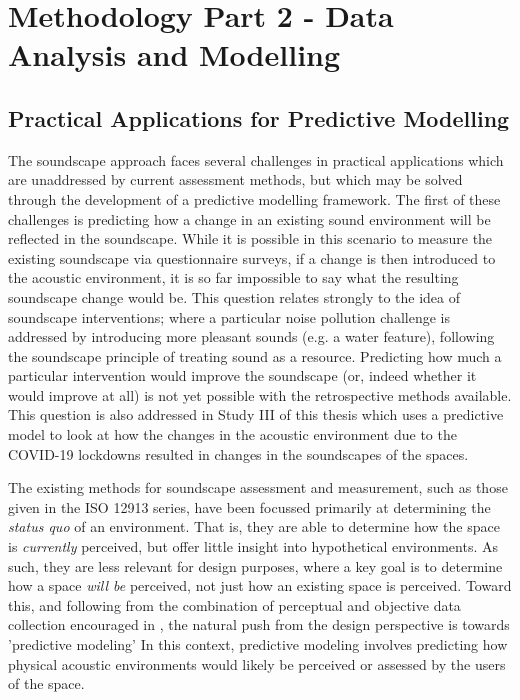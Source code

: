 \chapter{Methodology Part 2 - Data Analysis and Modelling}
\label{chap:methods}


\section{Practical Applications for Predictive Modelling}

The soundscape approach faces several challenges in practical applications which are unaddressed by current assessment methods, but which may be solved through the development of a predictive modelling framework. The first of these challenges is predicting how a change in an existing sound environment will be reflected in the soundscape. While it is possible in this scenario to measure the existing soundscape via questionnaire surveys, if a change is then introduced to the acoustic environment, it is so far impossible to say what the resulting soundscape change would be. This question relates strongly to the idea of soundscape interventions; where a particular noise pollution challenge is addressed by introducing more pleasant sounds (e.g. a water feature), following the soundscape principle of treating sound as a resource. Predicting how much a particular intervention would improve the soundscape (or, indeed whether it would improve at all) is not yet possible with the retrospective methods available. This question is also addressed in Study III of this thesis  which uses a predictive model to look at how the changes in the acoustic environment due to the COVID-19 lockdowns resulted in changes in the soundscapes of the spaces.

The existing methods for soundscape assessment and measurement, such as those given in the ISO 12913 series, have been focussed primarily at determining the \emph{status quo} of an environment. That is, they are able to determine how the space is \emph{currently} perceived, but offer little insight into hypothetical environments. As such, they are less relevant for design purposes, where a key goal is to determine how a space \emph{will be} perceived, not just how an existing space is perceived. Toward this, and following from the combination of perceptual and objective data collection encouraged in \citet{ISO12913Part2}, the natural push from the design perspective is towards 'predictive modeling' In this context, predictive modeling involves predicting how physical acoustic environments would likely be perceived or assessed by the users of the space.

